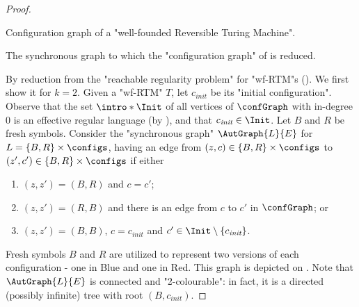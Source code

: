\begin{proof}%
    \begin{marginfigure}%
        \centering
        \begin{tikzpicture}
            
        \end{tikzpicture}
        \caption{
            \AP\label{fig:reduction-wf-RTM-to-colouring-config-graph-wf-RTM}
            Configuration graph of a "well-founded Reversible Turing Machine".
        }
    \end{marginfigure}%
    \begin{marginfigure}
        \centering
        \begin{tikzpicture}
            
        \end{tikzpicture}
        \caption{
            \AP\label{subfig:reduction-wf-RTM-to-colouring}
            The synchronous graph to which the "configuration graph"
            of  is reduced.
        }
    \end{marginfigure}%
    By reduction from the "reachable regularity problem" for "wf-RTM"s
    (). We first show it for $k=2$.
    \AP Given a "wf-RTM" $T$, let $c_{\textit{init}}$ be its "initial configuration".
    Observe that the set $\intro*\Init$ of all vertices of $\confGraph$ with in-degree $0$ is an effective regular language (by ), and that $c_{\textit{init}} \in \Init$. Let $B$ and $R$ be fresh symbols. 
    Consider the "synchronous graph" $\AutGraph{L}{E}$ for $L = \set{B,R} \times \configs$, having 
    an edge from $(z,c) \in \{B,R\} \times \configs$ to $(z',c') \in \{B,R\} \times \configs$ if either 
    \begin{enumerate}
        \item $(z,z') = (B,R)$ and $c=c'$;
        \item $(z,z') = (R,B)$ and there is an edge from $c$ to $c'$ in $\confGraph$; or
        \item $(z,z') = (B,B)$, $c = c_{\textit{init}}$ and $c' \in \Init \setminus \set{c_{\textit{init}}}$.
    \end{enumerate}
Fresh symbols $B$ and $R$ are utilized to represent two versions of each configuration - one in Blue and one in Red. This graph is depicted
    on .
    Note that $\AutGraph{L}{E}$ is connected and "2-colourable": in fact, it is a directed (possibly infinite) tree with root $(B,c_{\textit{init}})$. 
    

\end{proof}
